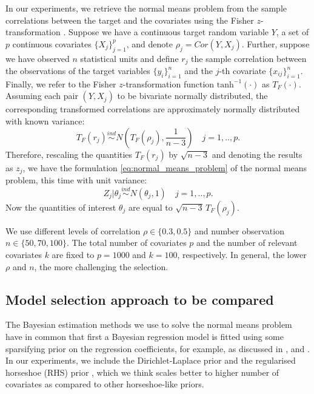 \documentclass[american,]{article}
\theoremstyle{definition}
\begin{document}
In our experiments, we retrieve the normal means problem from the
sample correlations between the target and the covariates using the
Fisher $z$-transformation \citep{hawkins1989using}. Suppose we have a
continuous target random variable $Y$, a set of $p$ continuous
covariates $\{X_{j}\}_{j=1}^{p}$, and denote
$\rho_{j}=Cor(Y,X_{j})$. Further, suppose we have observed $n$
statistical units and define $r_{j}$ the sample correlation between
the observations of the target variables $\{y_{i}\}_{i=1}^{n}$ and the
$j$-th covariate $\{x_{ij}\}_{i=1}^{n}$. Finally, we refer to the
Fisher $z$-transformation function $\text{tanh}^{-1}(\cdot)$ as
$T_{F}(\cdot)$. Assuming each pair $(Y,X_{j})$ to be bivariate
normally distributed, the corresponding transformed correlations are
approximately normally distributed with known variance: \
\begin{equation} \label{eq:fisher_transformation}
T_{F}(r_{j})\overset{ind}{\sim} N(T_{F}(\rho_{j}),\frac{1}{n-3}) \quad j=1,..,p.
\end{equation}
Therefore, rescaling the quantities $T_{F}(r_{j})$ by $\sqrt{n-3}$ and
denoting the results as $z_{j}$, we have the formulation
\eqref{eq:normal_means_problem} of the normal means problem, this time
with unit variance: \
\begin{equation} \label{eq:normal_means_problem2}
Z_{j}|\theta_{j}\overset{ind}{\sim}N(\theta_{j},1) \quad j=1,..,p.
\end{equation}
Now the quantities of interest $\theta_{j}$ are equal to
$\sqrt{n-3}\,T_{F}(\rho_{j})$.

We use different levels of correlation $\rho\in\{0.3,0.5\}$ and number
observation $n\in\{50,70,100\}$. The total number of covariates $p$
and the number of relevant covariates $k$ are fixed to $p = 1000$ and
$k = 100$, respectively. In general, the lower $\rho$ and $n$, the
more challenging the selection.

\subsection{Model selection approach to be compared}

The Bayesian estimation methods we use to solve the normal means
problem have in common that first a Bayesian regression model is
fitted using some sparsifying prior on the regression coefficients,
for example, as discussed in \cite{paper:dirichlet_laplace},
\cite{bhadra2017horseshoe+} and \cite{johnstone2004needles}.  In our
experiments, we include the Dirichlet-Laplace
\cite[DL;][]{paper:dirichlet_laplace} prior and the regularised
horseshoe (RHS) prior \citep{paper:rhs}, which we think scales better
to higher number of covariates as compared to other horseshoe-like
priors.
\end{document}
